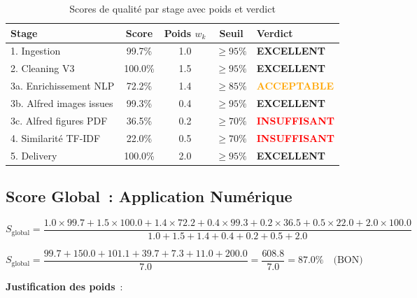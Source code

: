 \begin{table}[H]
\centering
\begin{tabular}{lcccl}
\toprule
\textbf{Stage} & \textbf{Score} & \textbf{Poids $w_k$} & \textbf{Seuil} & \textbf{Verdict} \\
\midrule
1. Ingestion & 99.7\% & 1.0 & $\geq 95\%$ & \textcolor{green!60!black}{\textbf{EXCELLENT}} \\
2. Cleaning V3 & 100.0\% & 1.5 & $\geq 95\%$ & \textcolor{green!60!black}{\textbf{EXCELLENT}} \\
3a. Enrichissement NLP & 72.2\% & 1.4 & $\geq 85\%$ & \textcolor{orange}{\textbf{ACCEPTABLE}} \\
3b. Alfred images issues & 99.3\% & 0.4 & $\geq 95\%$ & \textcolor{green!60!black}{\textbf{EXCELLENT}} \\
3c. Alfred figures PDF & 36.5\% & 0.2 & $\geq 70\%$ & \textcolor{red}{\textbf{INSUFFISANT}} \\
4. Similarité TF-IDF & 22.0\% & 0.5 & $\geq 70\%$ & \textcolor{red}{\textbf{INSUFFISANT}} \\
5. Delivery & 100.0\% & 2.0 & $\geq 95\%$ & \textcolor{green!60!black}{\textbf{EXCELLENT}} \\
\bottomrule
\end{tabular}
\caption{Scores de qualité par stage avec poids et verdict}
\label{tab:eval_scores_synthese}
\end{table}

\subsection{Score Global~: Application Numérique}
\label{sec:score_global_calcul}

\begin{equation}
S_{\text{global}} = \frac{1.0 \times 99.7 + 1.5 \times 100.0 + 1.4 \times 72.2 + 0.4 \times 99.3 + 0.2 \times 36.5 + 0.5 \times 22.0 + 2.0 \times 100.0}{1.0 + 1.5 + 1.4 + 0.4 + 0.2 + 0.5 + 2.0}
\end{equation}

\begin{equation}
S_{\text{global}} = \frac{99.7 + 150.0 + 101.1 + 39.7 + 7.3 + 11.0 + 200.0}{7.0} = \frac{608.8}{7.0} = \boxed{87.0\%} \quad \text{(BON)}
\label{eq:score_global_numerique}
\end{equation}

\textbf{Justification des poids}~:

